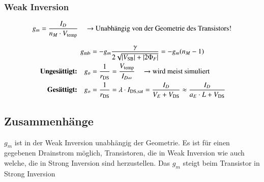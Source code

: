 \subsubsection{Weak Inversion}

\vspace{-0.3cm}

\[
    g_m = \frac{I_D}{n_M \cdot V_\text{temp}} \quad \text{ \textrightarrow\ Unabhängig von der Geometrie des Transistors!}
\]


\vspace{-0.15cm}

\begin{align*}
                                         g_{\rm mb} &= -g_m \frac{\gamma}{2 \sqrt{\abs{V_{\rm SB}} + \abs{2 \Phi_F}}} = - g_m (n_M - 1)                                             \\
    \text{ \textbf{Ungesättigt:}} \quad     g_o &= \frac{1}{r_{\rm DS}} = \frac{V_{\text{temp}}}{I_{D \infty}} \quad \text{ \textrightarrow\ wird meist simuliert}              \\
    \text{ \textbf{Gesättigt:}} \quad       g_o &=  \frac{1}{r_{\rm DS}} = \lambda \cdot  I_{\rm DS, sat} = \frac{I_D}{V_E + V_{\rm DS}}  \approx \frac{I_D}{a_E \cdot L + V_{\rm DS}}
\end{align*}



\subsection{Zusammenhänge}

$g_m$ ist in der Weak Inversion unabhängig der Geometrie. 
Es ist für einen gegebenen Drainstrom möglich, Transistoren, die in Weak Inversion wie auch welche, die in Strong Inversion sind herzustellen.
Das $g_m$ steigt beim Transistor in Strong Inversion 


